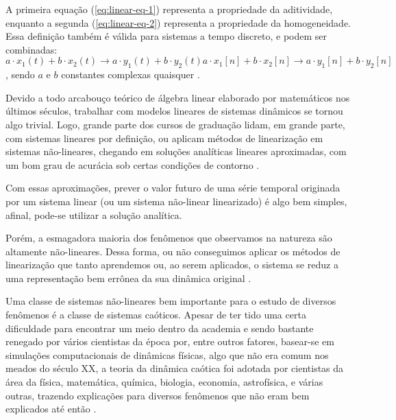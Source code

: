 \documentclass[a4paper, 12pt]{article}
\begin{document}
A primeira equação (\ref{eq:linear-eq-1}) representa a propriedade da aditividade, enquanto a segunda (\ref{eq:linear-eq-2}) representa a propriedade da homogeneidade. Essa definição também é válida para sistemas a tempo discreto, e podem ser combinadas:
\begin{subequations}
\begin{equation}
a \cdot x_1(t) + b \cdot x_2(t) \rightarrow a \cdot y_1(t) + b \cdot y_2(t)
\end{equation}
\begin{equation}
a \cdot x_1[n] + b \cdot x_2[n] \rightarrow a \cdot y_1[n] + b \cdot y_2[n]
\end{equation}
\end{subequations}
, sendo $a$ e $b$ constantes complexas quaisquer \cite{oppenheim2014signals}.

Devido a todo arcabouço teórico de álgebra linear elaborado por matemáticos nos últimos séculos, trabalhar com modelos lineares de sistemas dinâmicos se tornou algo trivial. Logo, grande parte dos cursos de graduação lidam, em grande parte, com sistemas lineares por definição, ou aplicam métodos de linearização em sistemas não-lineares, chegando em soluções analíticas lineares aproximadas, com um bom grau de acurácia sob certas condições de contorno \cite{fiedler1994caos}. 

Com essas aproximações, prever o valor futuro de uma série temporal originada por um sistema linear (ou um sistema não-linear linearizado) é algo bem simples, afinal, pode-se utilizar a solução analítica.

Porém, a esmagadora maioria dos fenômenos que observamos na natureza são altamente não-lineares. Dessa forma, ou não conseguimos aplicar os métodos de linearização que tanto aprendemos ou, ao serem aplicados, o sistema se reduz a uma representação bem errônea da sua dinâmica original \cite{gleick2008chaos}.

Uma classe de sistemas não-lineares bem importante para o estudo de diversos fenômenos é a classe de sistemas caóticos. Apesar de ter tido uma certa dificuldade para encontrar um meio dentro da academia e sendo bastante renegado por vários cientistas da época por, entre outros fatores, basear-se em simulações  computacionais de dinâmicas físicas, algo que não era comum nos meados do século XX, a teoria da dinâmica caótica foi adotada por cientistas da área da física, matemática, química, biologia, economia, astrofísica, e várias outras, trazendo explicações para diversos fenômenos que não eram bem explicados até então \cite{gleick2008chaos}. 
\end{document}

